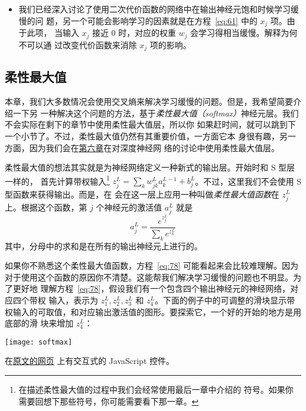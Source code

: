 \begin{itemize}
\item 我们已经深入讨论了使用二次代价函数的网络中在输出神经元饱和时候学习缓慢的问
  题，另一个可能会影响学习的因素就是在方程~\eqref{eq:61} 中的 $x_j$ 项。由于此项，
  当输入 $x_j$ 接近 $0$ 时，对应的权重 $w_j$ 会学习得相当缓慢。解释为何不可以通
  过改变代价函数来消除 $x_j$ 项的影响。
\end{itemize}

\subsection{柔性最大值}
\label{subsec:softmax}

本章，我们大多数情况会使用交叉熵来解决学习缓慢的问题。但是，我希望简要介绍一下另
一种解决这个问题的方法，基于\emph{柔性最大值（softmax）}神经元层。我们不会实际在剩下的章节中使用柔性最大值层，所以你
如果赶时间，就可以跳到下一个小节了。不过，柔性最大值仍然有其重要价值，一方面它本
身很有趣，另一方面，因为我们会在\hyperref[ch:Deeplearning]{第六章}在对深度神经网
络的讨论中使用柔性最大值层。

柔性最大值的想法其实就是为神经网络定义一种新式的输出层。开始时和 S 型层一样的，
首先计算带权输入\footnote{在描述柔性最大值的过程中我们会经常使用最后一章中介绍的
  符号。如果你需要回想下那些符号，你可能需要看下那一章。} $z^L_j = \sum_{k}
w^L_{jk} a^{L-1}_k + b^L_j$。不过，这里我们不会使用 S 型函数来获得输出。而是，在
会在这一层上应用一种叫做\emph{柔性最大值函数}在 $z^L_j$ 上。根据这个函数，第 $j$ 个神经元的激活值 $a^L_j$ 就是
\begin{equation}
  a^L_j = \frac{e^{z^L_j}}{\sum_k e^{z^L_k}}
  \label{eq:78}\tag{78}
\end{equation}
其中，分母中的求和是在所有的输出神经元上进行的。

如果你不熟悉这个柔性最大值函数，方程~\eqref{eq:78} 可能看起来会比较难理解。因为
对于使用这个函数的原因你不清楚。这能帮我们解决学习缓慢的问题也不明显。为了更好地
理解方程~\eqref{eq:78}，假设我们有一个包含四个输出神经元的神经网络，对应四个带权
输入，表示为 $z^L_1, z^L_2, z^L_3$ 和 $z^L_4$。下面的例子中的可调整的滑块显示带
权输入的可取值，和对应输出激活值的图形。要探索它，一个好的开始的地方是用底部的滑
块来增加 $z^L_4$：

\begin{center}
  \texttt{[image: softmax]}
\end{center}

在\href{http://neuralnetworksanddeeplearning.com/chap3.html#softmax}{原文的网页}
上有交互式的 JavaScript 控件。

